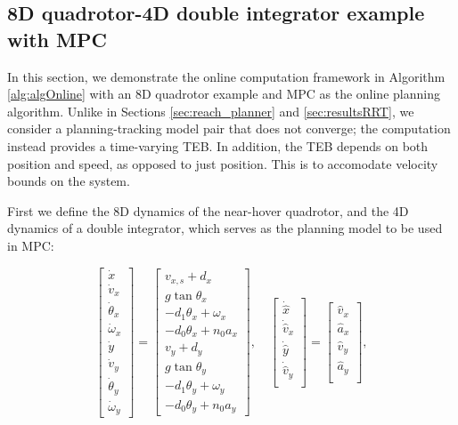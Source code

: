 \subsection{8D quadrotor-4D double integrator example with MPC \label{sec:resultsMPC}}

In this section, we demonstrate the online computation framework in Algorithm \ref{alg:algOnline} with an 8D quadrotor example and MPC as the online planning algorithm. 
Unlike in Sections \ref{sec:reach_planner} and \ref{sec:resultsRRT}, we consider a planning-tracking model pair that does not converge; the computation instead provides a time-varying TEB. In addition, the TEB depends on both position and speed, as opposed to just position. This is to accomodate velocity bounds on the system.


First we define the 8D dynamics of the near-hover quadrotor, and the 4D dynamics of a double integrator, which serves as the planning model to be used in MPC:

\begin{equation}
\label{eq:Quad8D_dyn}
\begin{bmatrix}
\dot x\\
\dot v_x\\
\dot \theta_x\\
\dot \omega_x\\
\dot y\\
\dot v_y\\
\dot \theta_y\\
\dot \omega_y
\end{bmatrix} =
\begin{bmatrix}
v_{x,s} + d_x\\
g \tan \theta_x\\
-d_1 \theta_x + \omega_x\\
-d_0 \theta_x + n_0 a_x\\
v_y + d_y\\
g \tan \theta_y\\
-d_1 \theta_y + \omega_y\\
-d_0 \theta_y + n_0 a_y
\end{bmatrix}, \quad
\begin{bmatrix}
\dot {\hat x}\\
\dot {\hat v}_x\\
\dot {\hat y}\\
\dot {\hat v}_y\\
\end{bmatrix} =
\begin{bmatrix}
\hat v_x\\
\hat a_x\\
\hat v_y\\
\hat a_y\\
\end{bmatrix},
\end{equation}

